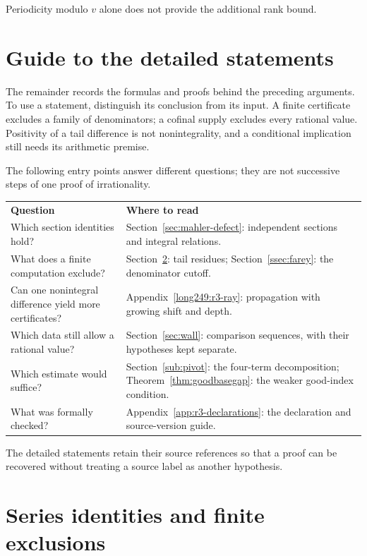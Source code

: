 \documentclass[11pt]{article}
\theoremstyle{plain}
\theoremstyle{definition}
\theoremstyle{remark}
\begin{document}
Periodicity modulo $v$ alone does not provide the additional rank bound.


\section{Guide to the detailed statements}

The remainder records the formulas and proofs behind the preceding
arguments. To use a statement, distinguish its conclusion from its
input. A finite certificate excludes a family of denominators; a
cofinal supply excludes every rational value. Positivity of a tail
difference is not nonintegrality, and a conditional implication still
needs its arithmetic premise.

The following entry points answer different questions; they are not
successive steps of one proof of irrationality.
\begin{center}
\begin{tabular}{@{}p{.39\linewidth}p{.55\linewidth}@{}}
\textbf{Question} & \textbf{Where to read}\\[3pt]
Which section identities hold? &
Section~\ref{sec:mahler-defect}: independent sections and integral relations.\\[3pt]
What does a finite computation exclude? &
Section~\ref{sec:series}: tail residues; Section~\ref{ssec:farey}: the denominator cutoff.\\[3pt]
Can one nonintegral difference yield more certificates? &
Appendix~\ref{long249:r3-ray}: propagation with growing shift and depth.\\[3pt]
Which data still allow a rational value? &
Section~\ref{sec:wall}: comparison sequences, with their hypotheses kept separate.\\[3pt]
Which estimate would suffice? &
Section~\ref{sub:pivot}: the four-term decomposition;
Theorem~\ref{thm:goodbasegap}: the weaker good-index condition.\\[3pt]
What was formally checked? &
Appendix~\ref{app:r3-declarations}: the declaration and source-version guide.
\end{tabular}
\end{center}
The detailed statements retain their source references so that a proof
can be recovered without treating a source label as another hypothesis.
\section{Series identities and finite exclusions}\label{sec:series}
\end{document}
